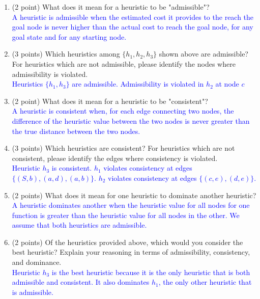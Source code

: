 \documentclass[12pt]{article}
\newenvironment{qparts}{\begin{enumerate}[{(}a{)}]}{\end{enumerate}}
\begin{document}
\begin{qparts}
  \item (2 point)
  What does it mean for a heuristic to be "admissible"? \\
  \textcolor{blue}{A heuristic is admissible when the estimated cost it provides to the reach the goal node is never higher than the actual cost to reach the goal node, for any goal state and for any starting node.}

  \item (3 points)
  Which heuristics among $\{h_1, h_2, h_3\}$ shown above
  are admissible? For heuristics which are not admissible,
  please identify the nodes where admissibility is violated. \\
  \textcolor{blue}{Heuristics $\{h_1, h_3\}$ are admissible. Admissibility is violated in $h_2$ at node $c$}


  \item (2 point)
  What does it mean for a heuristic to be "consistent"? \\
  \textcolor{blue}{A heuristic is consistent when, for each edge connecting two nodes, the difference of the heuristic value between the two nodes is never greater than the true distance between the two nodes.}


  \item (3 points)
  Which heuristics are consistent?
  For heuristics which are not consistent,
  please identify the edges where consistency is violated.\\
  \textcolor{blue}{Heuristic $h_3$ is consistent. $h_1$ violates consistency at edges $\{(S, b), (a, d), (a, b)\}$.
    $h_2$ violates consistency at edges $\{(c, e), (d, e)\}$.}

  \item (2 points) What does it mean for one heuristic to
  dominate another heuristic?\\
  \textcolor{blue}{A heuristic dominates another when the heuristic value for all nodes for one function is greater than the heuristic value for all nodes in the other. We assume that both heuristics are admissible.}

  \item (2 points) Of the heuristics provided above,
  which would you consider the best heuristic?
  Explain your reasoning in terms of admissibility,
  consistency, and dominance.\\
  \textcolor{blue}{Heuristic $h_3$ is the best heuristic because it is the only heuristic that is both admissible and consistent. It also dominates $h_1$, the only other heuristic that is admissible.}


\end{qparts}
\end{document}

